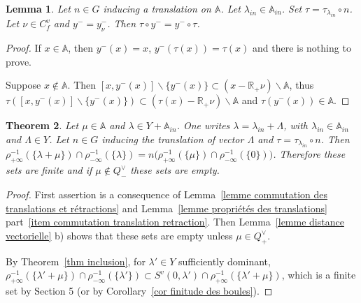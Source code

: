 \documentclass[12pt]{article}
\theoremstyle{plain}
\newtheorem{theorem}{Theorem}[section] %
\newtheorem{lemma}[theorem]{Lemma}
\theoremstyle{definition}
\newcommand{\R}{\mathbb{R}}
\newcommand{\A}{\mathbb{A}}
\begin{document}
 

\begin{lemma}\label{lemme y- des translatés}
Let $n\in G$ inducing a translation on $\mathbb{A}$. Let $\lambda_{in}\in \A_{in}$. Set $\tau=\tau_{\lambda_{in}}\circ n$. Let $\nu\in C_f^v$ and $y^-=y_\nu^-$. Then $\tau\circ y^-=y^-\circ \tau$.
\end{lemma}

\begin{proof} If $x\in \mathbb{A}$, then $y^-(x)=x$, $y^-(\tau(x))=\tau(x)$ and there is nothing to prove. 

Suppose $x\notin \mathbb{A}$. 
Then $[x,y^-(x)]\backslash \{y^-(x)\}\subset (x-\R_+\nu)\backslash \mathbb{A}$,
 thus $\tau([x,y^-(x)]\backslash\{y^-(x)\})\subset (\tau(x)-\R_+\nu)\backslash \mathbb{A}$ and $\tau(y^-(x))\in \mathbb{A}$.  
 \end{proof}




\begin{theorem}\label{thm invariance des cardinaux}
Let $\mu\in \A$ and $\lambda\in Y+\A_{in}$. One writes $\lambda=\lambda_{in}+\Lambda$, with $\lambda_{in}\in\A_{in}$ and $\Lambda\in Y$. Let $n\in G$ inducing the translation of vector $\Lambda$ and $\tau=\tau_{\lambda_{in}}\circ n$. Then $\rho_{+\infty}^{-1}(\{\lambda+\mu\})\cap\rho_{-\infty}^{-1}(\{\lambda\})=n\big(\rho_{+\infty}^{-1}(\{\mu\})\cap\rho_{-\infty}^{-1}(\{0\})\big)$. Therefore these sets are finite and if $\mu\notin Q^\vee_-$ these sets are empty.

\end{theorem}

\begin{proof} First assertion is a consequence of Lemma~\ref{lemme commutation des translations et rétractions} and Lemma~\ref{lemme propriétés des translations} part~\ref{item commutation translation retraction}. Then Lemma~\ref{lemme distance vectorielle} b) shows that these sets are empty unless $\mu\in Q^\vee_+$. 

By Theorem~\ref{thm inclusion}, for $\lambda'\in Y$ sufficiently dominant, $\rho_{+\infty}^{-1}(\{\lambda'+\mu\})\cap\rho_{-\infty}^{-1}(\{\lambda'\})\subset S^v(0,\lambda')\cap \rho_{+\infty}^{-1}(\{\lambda'+\mu\})$, which is a finite set by \cite{gaussent2014spherical} Section 5 (or by Corollary~\ref{cor finitude des boules}).  

\end{proof}
\end{document}
